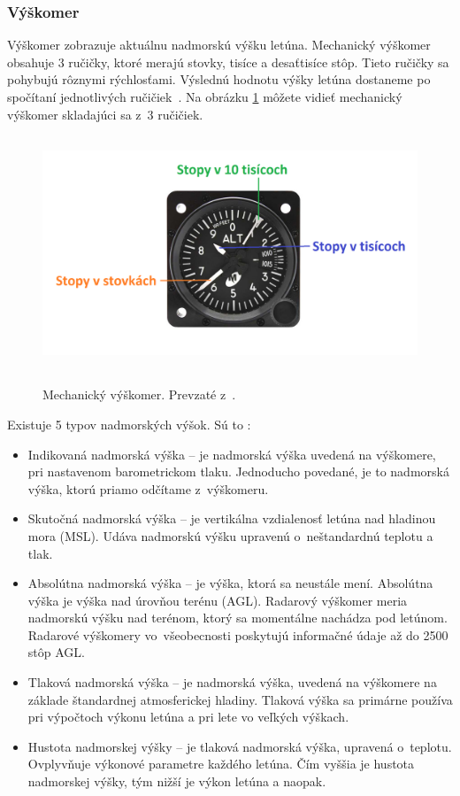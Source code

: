\subsubsection{Výškomer}
Výškomer zobrazuje aktuálnu nadmorskú výšku letúna. Mechanický výškomer obsahuje 3 ručičky, ktoré merajú stovky, tisíce a desaťtisíce stôp. Tieto ručičky sa pohybujú rôznymi rýchlosťami. Výslednú hodnotu výšky letúna dostaneme po spočítaní jednotlivých ručičiek~\cite{Instruments}. Na obrázku \ref{vyskomer} môžete vidieť mechanický výškomer skladajúci sa z~3 ručičiek.
\begin{figure}[ht]
\centering
\includegraphics[height=7cm, width=13cm]{obrazky-figures/vyskomer.png}
\caption{Mechanický výškomer. Prevzaté z~\cite{fotoIndikator}.}{\label{vyskomer}}
\end{figure}


Existuje 5 typov nadmorských výšok. Sú to \cite{Altitude}:
\begin{itemize}
    \item Indikovaná nadmorská výška – je nadmorská výška uvedená na výškomere, pri nastavenom barometrickom tlaku. Jednoducho povedané, je to nadmorská výška, ktorú priamo odčítame z~výškomeru. 
    \item Skutočná nadmorská výška – je vertikálna vzdialenosť letúna nad hladinou mora (MSL). Udáva nadmorskú výšku upravenú o~neštandardnú teplotu a tlak.
    \item Absolútna nadmorská výška – je výška, ktorá sa neustále mení. Absolútna výška je výška nad úrovňou terénu (AGL). Radarový výškomer meria nadmorskú výšku nad terénom, ktorý sa momentálne nachádza pod letúnom. Radarové výškomery vo~všeobecnosti poskytujú informačné údaje až do 2500 stôp AGL.
    \item Tlaková nadmorská výška – je nadmorská výška, uvedená na výškomere na základe štandardnej atmosferickej hladiny. Tlaková výška sa primárne používa pri výpočtoch výkonu letúna a pri lete vo veľkých výškach. 
    \item Hustota nadmorskej výšky – je tlaková nadmorská výška, upravená o~teplotu. Ovplyvňuje výkonové parametre každého letúna. Čím vyššia je hustota nadmorskej výšky, tým nižší je výkon letúna a naopak.
\end{itemize}

